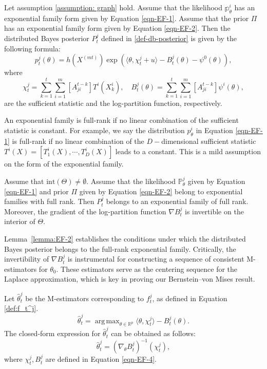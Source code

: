 \documentclass[twoside,11pt]{article}
\numberwithin{equation}{section}
\newcommand{\R}{{\mathbb{R}}}
\newcommand\bP{\mathbb{P}}
\newcommand\bp{\mathbb{p}}
\DeclareMathOperator*{\argmax}{arg\,max}
\begin{document}
{\begin{lemma}\label{lemma:EF-1}
Let assumption \eqref{assumption: graph} hold. Assume that the likelihood $\bp_\theta^i$ has an exponential family form given by Equation \eqref{eqn-EF-1}. Assume that the prior $\Pi$ has an exponential family form given by Equation \eqref{eqn-EF-2}.  Then the distributed Bayes posterior $P_t^j$ defined in \eqref{def-db-posterior} is given by the following formula: 
    \begin{equation}\label{eqn-EF-3}
         p_t^j (\theta) = h(X^{(mt)}) \exp(\langle \theta, \chi_t^j + u\rangle - B_t^j(\theta) - \psi^0(\theta)), 
    \end{equation}
    where 
    \begin{equation}\label{eqn-EF-4}
        \chi_t^j =   \sum_{k = 1}^t \sum_{i = 1}^m [A^{t-k}_{ji}] T^i(X_k^i),  \quad B_t^j(\theta) =  \sum_{k = 1}^t \sum_{i = 1}^m [A^{t-k}_{ji}] \psi^i(\theta) , 
    \end{equation}
    are the sufficient statistic and the log-partition function, respectively. 
\end{lemma}
An exponential family is full-rank if no linear combination of the sufficient statistic is constant. For example, we say the distribution $p_\theta^i$ in Equation \eqref{eqn-EF-1} is full-rank if no linear combination of the $D-$dimensional sufficient statistic $T^i(X) = [T^i_1(X), \cdots, T^i_D(X)]$ leads to a constant. This is a mild assumption on the form of the exponential family. 
\begin{lemma}\label{lemma:EF-2}
Assume that $\text{int}(\Theta) \neq \emptyset$. Assume that the likelihood $\bP_\theta^j$  given by Equation \eqref{eqn-EF-1}  and prior $\Pi$ given by Equation \eqref{eqn-EF-2} belong to exponential families with full rank. Then $P_t^j$ belongs to an exponential family of full rank. Moreover, the gradient of the log-partition function $\nabla B_t^j$ is invertible on the interior of $\Theta$. 
\end{lemma}
Lemma~\ref{lemma:EF-2} establishes the conditions under which the distributed Bayes posterior belongs to the full-rank exponential family. Critically, the invertibility of \(\nabla B_t^j\) is instrumental for constructing a sequence of consistent M-estimators for \(\theta_0\). These estimators serve as the centering sequence for the Laplace approximation, which is key in proving our Bernstein–von Mises result.

Let $\hat \theta_t^j$ be the M-estimators corresponding to $f_t^j$, as defined in Equation \eqref{def:f_t^j}.  
\begin{equation*}
    \hat \theta_t^j = \argmax_{\theta \in \R^p}\langle \theta, \chi_t^j \rangle - B_t^j(\theta). 
\end{equation*}
The closed-form expression for $\hat \theta_t^j$ can be obtained as follows:
\begin{equation}\label{eqn-EF-5}
    \hat \theta_t^j = (\nabla_\theta B_t^j)^{-1}(\chi_t^j), 
\end{equation}
where $\chi_t^j, B_t^j$ are defined in Equation \eqref{eqn-EF-4}.

}
\end{document}
